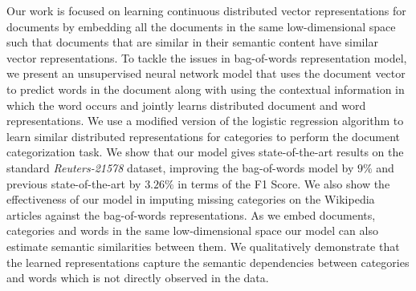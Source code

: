 Our work is focused on learning continuous distributed vector representations for documents by embedding all the documents in the same low-dimensional space such that documents that are similar in their semantic content have similar vector representations. To tackle the issues in bag-of-words representation model, we present an unsupervised neural network model that uses the document vector to predict words in the document along with using the contextual information in which the word occurs and jointly learns distributed document and word representations. We use a modified version of the logistic regression algorithm to learn similar distributed representations for categories to perform the document categorization task. 
We show that our model gives state-of-the-art results on the standard \emph{Reuters-21578} dataset, improving the bag-of-words model by $9\%$ and previous state-of-the-art by $3.26\%$ in terms of the F1 Score. We also show the effectiveness of our model in imputing missing categories on the Wikipedia articles against the bag-of-words representations. 
As we embed documents, categories and words in the same low-dimensional space our model can also estimate semantic similarities between them. We qualitatively demonstrate that the learned representations capture the semantic dependencies between categories and words which is not directly observed in the data. 